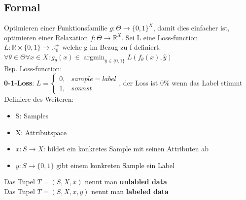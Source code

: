 \documentclass[12pt,a4paper]{article}
\DeclareMathOperator*{\argmin}{argmin}
\newcommand{\nl}{\\[0.1cm]}
\begin{document}
\subsection{Formal}
Optimieren einer Funktionsfamilie $g: \Theta \rightarrow \{0,1\}^X$, damit dies einfacher ist, optimieren einer Relaxation $f: \Theta \rightarrow \mathbb{R}^X$. Sei L eine Loss-function $L: \mathbb{R} \times \{0,1\} \rightarrow \mathbb{R}_0^+$ welche g im Bezug zu f definiert.\nl
$\displaystyle \forall \theta \in \Theta \forall x \in X: g_\theta(x) \in \argmin_{\hat{y} \in \{0,1\}} L(f_\theta(x),\hat{y})$\\
Bsp. Loss-function:\nl
\textbf{0-1-Loss}:
$\displaystyle L=\begin{cases} 0,& sample=label\\ 1, & sonnst \end{cases}$, der Loss ist 0\% wenn das Label stimmt\nl

Definiere des Weiteren:
\begin{itemize}
\item S: Samples
\item X: Attributspace
\item $x: S\rightarrow X$: bildet ein konkretes Sample mit seinen Attributen ab
\item $y: S\rightarrow \{0,1\}$ gibt einem konkreten Sample ein Label
\end{itemize}

Das Tupel $T=(S,X,x)$ nennt man \textbf{unlabled data}\\
Das Tupel $T=(S,X,x,y)$ nennt man \textbf{labeled data}\nl
\end{document}
